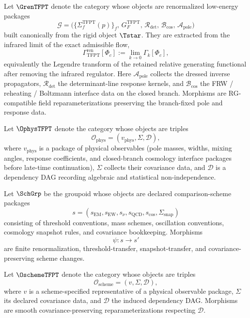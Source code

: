 \begin{definition}
\label{def:renormalized-low-energy-package}
Let $\GrenTFPT$ denote the category whose objects are renormalized low-energy packages
\[
\mathcal G=
\bigl(
\{\Sigma_f^{\mathrm{TFPT}}(p)\}_f,\,
G_F^{\mathrm{TFPT}},\,
\mathcal R_{\det},\,
\mathcal B_{\mathrm{cos}},\,
\mathcal A_{\mathrm{pole}}
\bigr)
\]
built canonically from the rigid object $\Tstar$. They are extracted from the infrared limit of the
exact admissible flow,
\[
\Gamma_{\mathrm{TFPT}}^{\mathrm{ren}}[\Phi_c]
:=
\lim_{k\to0}\Gamma_k[\Phi_c],
\]
equivalently the Legendre transform of the retained relative generating functional after removing
the infrared regulator. Here $\mathcal A_{\mathrm{pole}}$ collects the dressed inverse propagators,
$\mathcal R_{\det}$ the determinant-line response kernels, and $\mathcal B_{\mathrm{cos}}$ the
FRW / reheating / Boltzmann interface data on the closed branch. Morphisms are RG-compatible field
reparameterizations preserving the branch-fixed pole and response data.
\end{definition}

\begin{definition}
\label{def:physical-observable-category}
Let $\OphysTFPT$ denote the category whose objects are triples
\[
\mathcal O_{\mathrm{phys}}=(v_{\mathrm{phys}},\Sigma,\mathcal D),
\]
where $v_{\mathrm{phys}}$ is a package of physical observables (pole masses, widths, mixing angles,
response coefficients, and closed-branch cosmology interface packages before late-time
continuation), $\Sigma$ collects their covariance data, and
$\mathcal D$ is a dependency DAG recording algebraic and statistical non-independence.
\end{definition}

\begin{definition}
\label{def:scheme-groupoid}
Let $\SchGrp$ be the groupoid whose objects are declared comparison-scheme packages
\[
s=(s_{\mathrm{EM}},s_{\mathrm{EW}},s_{\nu},s_{\mathrm{QCD}},s_{\mathrm{cos}},\Sigma_{\mathrm{snap}})
\]
consisting of threshold conventions, mass schemes, oscillation conventions, cosmology snapshot
rules, and covariance bookkeeping. Morphisms
\[
\psi:s\to s'
\]
are finite renormalization, threshold-transfer, snapshot-transfer, and covariance-preserving
scheme changes.
\end{definition}

\begin{definition}
\label{def:obs-category}
Let $\OschemeTFPT$ denote the category whose objects are triples
\[
\mathcal O_{\mathrm{scheme}}=(v,\Sigma,\mathcal D),
\]
where $v$ is a scheme-specified representative of a physical observable package, $\Sigma$ its
declared covariance data, and $\mathcal D$ the induced dependency DAG. Morphisms are smooth
covariance-preserving reparameterizations respecting $\mathcal D$.
\end{definition}

